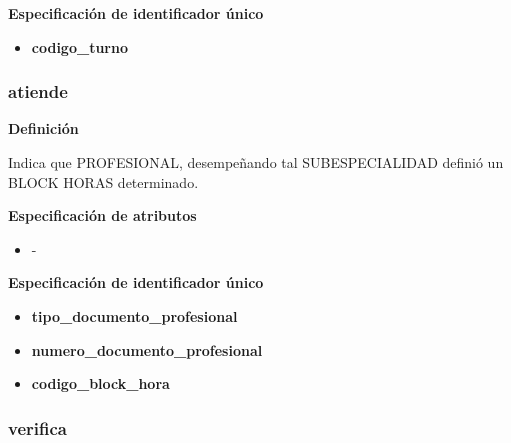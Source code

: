 \documentclass[a4paper,11pt]{article}
\begin{document}
\textbf{Especificación de identificador único}

\begin{itemize}

    \item \textbf{codigo\_turno}

\end{itemize}

\subsubsection{\textbf{atiende}}

\textbf{Definición}

Indica que PROFESIONAL, desempeñando tal SUBESPECIALIDAD definió un BLOCK 
HORAS determinado.

\textbf{Especificación de atributos}

\begin{itemize}

    \item -

\end{itemize}

\textbf{Especificación de identificador único}

\begin{itemize}

\item \textbf{tipo\_documento\_profesional}  

\item \textbf{numero\_documento\_profesional}







 \item \textbf{codigo\_block\_hora}

\end{itemize}

\subsubsection{\textbf{verifica}}
\end{document}
